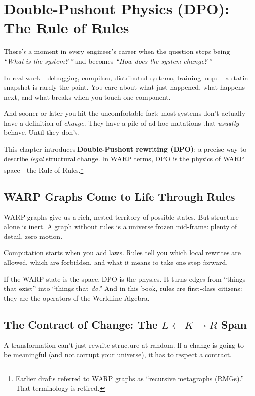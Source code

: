 \chapter{Double-Pushout Physics (DPO): The Rule of Rules}
\label{chap:dpo-physics}

There's a moment in every engineer's career when the question stops being \textit{``What is the system?\,''} and becomes \textit{``How does the system change?\,''}

In real work---debugging, compilers, distributed systems, training loops---a static snapshot is rarely the point. You care about what just happened, what happens next, and what breaks when you touch one component.

And sooner or later you hit the uncomfortable fact: most systems don't actually have a definition of \textit{change}. They have a pile of ad-hoc mutations that \textit{usually} behave. Until they don't.

This chapter introduces \textbf{Double-Pushout rewriting (DPO)}: a precise way to describe \emph{legal} structural change. In WARP terms, DPO is the physics of WARP space---the Rule of Rules.\footnote{Earlier drafts referred to WARP graphs as ``recursive metagraphs (RMGs).'' That terminology is retired.}

\section{WARP Graphs Come to Life Through Rules}
\label{sec:warp-life}

WARP graphs give us a rich, nested territory of possible states. But structure alone is inert. A graph without rules is a universe frozen mid-frame: plenty of detail, zero motion.

Computation starts when you add laws.
Rules tell you which local rewrites are allowed, which are forbidden, and what it means to take one step forward.

If the WARP state is the space, DPO is the physics. It turns edges from ``things that exist'' into ``things that \emph{do}.''
And in this book, rules are first-class citizens: they are the operators of the Worldline Algebra.

\section{The Contract of Change: The $L \leftarrow K \rightarrow R$ Span}
\label{sec:warp-contract}

A transformation can't just rewrite structure at random. If a change is going to be meaningful (and not corrupt your universe), it has to respect a contract.

